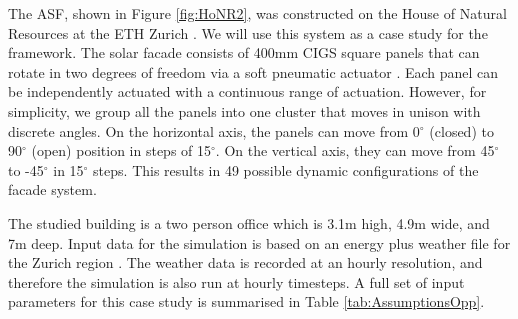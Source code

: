 The ASF, shown in Figure \ref{fig:HoNR2}, was constructed on the House of Natural Resources at the ETH Zurich \cite{nagy2016adaptive}. We will use this system as a case study for the framework. The solar facade consists of 400mm CIGS square panels that can rotate in two degrees of freedom via a soft pneumatic actuator \cite{svetozarevic2016soro}. Each panel can be independently actuated with a continuous range of actuation. However, for simplicity, we group all the panels into one cluster that moves in unison with discrete angles. On the horizontal axis, the panels can move from 0$^{\circ}$ (closed) to 90$^{\circ}$ (open) position in steps of 15$^{\circ}$. On the vertical axis, they can move from 45$^{\circ}$ to -45$^{\circ}$ in 15$^{\circ}$ steps. This results in 49 possible dynamic configurations of the facade system.

The studied building is a two person office which is 3.1m high, 4.9m wide, and 7m deep. Input data for the simulation is based on an energy plus weather file for the Zurich region \cite{remund1997meteonorm}. The weather data is recorded at an hourly resolution, and therefore the simulation is also run at hourly timesteps. A full set of input parameters for this case study is summarised in Table \ref{tab:AssumptionsOpp}.



